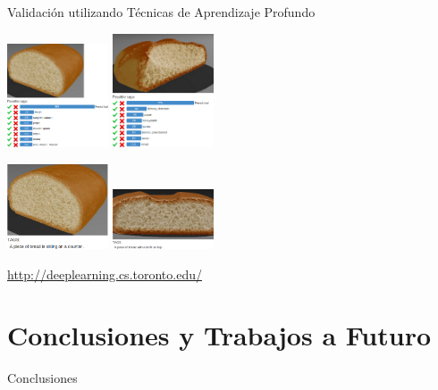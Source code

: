 \documentclass[spanish,unknownkeysallowed]{beamer}
\begin{document}
\begin{frame}{Validación utilizando Técnicas de Aprendizaje Profundo}




\centering
\includegraphics[width=3cm]{../figures/deep1}
\includegraphics[width=3cm]{../figures/deep4}

\includegraphics[width=3cm]{../figures/deep2}
\includegraphics[width=3cm]{../figures/deep3}


\vspace{0.4cm}
\url{http://deeplearning.cs.toronto.edu/}

\end{frame}



\section[Conclusiones]{Conclusiones y Trabajos a Futuro}


\begin{frame}
\begin{block}{}
\begin{center}
\vspace{1cm}
\huge{Conclusiones}
\vspace{1cm}
\end{center}
\end{block}
\end{frame}
\end{document}
